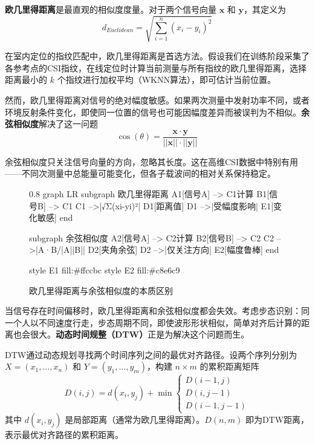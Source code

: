 \textbf{欧几里得距离}是最直观的相似度度量。对于两个信号向量 $\mathbf{x}$ 和 $\mathbf{y}$，其定义为
\begin{equation}
    d_{Euclidean} = \sqrt{\sum_{i=1}^{n}(x_i - y_i)^2}
\end{equation}

在室内定位的指纹匹配中，欧几里得距离是首选方法。假设我们在训练阶段采集了各参考点的CSI指纹，在线定位时计算当前测量与所有指纹的欧几里得距离，选择距离最小的 $k$ 个指纹进行加权平均（WKNN算法），即可估计当前位置。

然而，欧几里得距离对信号的绝对幅度敏感。如果两次测量中发射功率不同，或者环境反射条件变化，即使同一位置的信号也可能因幅度差异而被误判为不相似。\textbf{余弦相似度}解决了这一问题
\begin{equation}
    \cos(\theta) = \frac{\mathbf{x} \cdot \mathbf{y}}{||\mathbf{x}|| \cdot ||\mathbf{y}||}
\end{equation}

余弦相似度只关注信号向量的方向，忽略其长度。这在高维CSI数据中特别有用——不同次测量中总能量可能变化，但各子载波间的相对关系保持稳定。

\begin{figure}[htbp]
    \centering
    \begin{mmd}{0.8\textwidth}
graph LR
    subgraph 欧几里得距离
        A1[信号A] --> C1{计算}
        B1[信号B] --> C1
        C1 -->|√Σ(xi-yi)²| D1[距离值]
        D1 -->|受幅度影响| E1[变化敏感]
    end
    
    subgraph 余弦相似度
        A2[信号A] --> C2{计算}
        B2[信号B] --> C2
        C2 -->|A·B/|A||B|| D2[夹角余弦]
        D2 -->|仅关注方向| E2[幅度鲁棒]
    end
    
    style E1 fill:#ffccbc
    style E2 fill:#c8e6c9
    \end{mmd}
    \caption{欧几里得距离与余弦相似度的本质区别}
    \label{fig:euclidean-vs-cosine}
\end{figure}

当信号存在时间偏移时，欧几里得距离和余弦相似度都会失效。考虑步态识别：同一个人以不同速度行走，步态周期不同，即使波形形状相似，简单对齐后计算的距离也会很大。\textbf{动态时间规整（DTW）}正是为解决这个问题而生。

DTW通过动态规划寻找两个时间序列之间的最优对齐路径。设两个序列分别为 $X = (x_1, ..., x_n)$ 和 $Y = (y_1, ..., y_m)$，构建 $n \times m$ 的累积距离矩阵
\begin{equation}
    D(i,j) = d(x_i, y_j) + \min\begin{cases} D(i-1, j) \\ D(i, j-1) \\ D(i-1, j-1) \end{cases}
\end{equation}
其中 $d(x_i, y_j)$ 是局部距离（通常为欧几里得距离）。$D(n,m)$ 即为DTW距离，表示最优对齐路径的累积距离。

